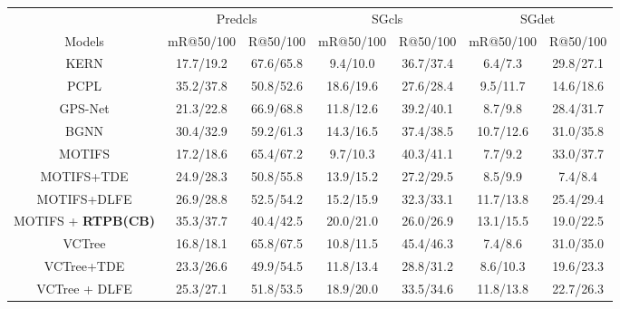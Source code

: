 \documentclass[letterpaper]{article} %
\begin{document}
\begin{table}[!ht]
	\centering
	\small
	\begin{tabular}{c|cc|cc|cc}
		\hline
		& \multicolumn{2}{c|}{Predcls} & \multicolumn{2}{c|}{SGcls} & \multicolumn{2}{c}{SGdet} \\
		Models                         & mR@50/100     & R@50/100     & mR@50/100    & R@50/100    & mR@50/100    & R@50/100    \\ \hline
		KERN\ddag\cite{chen2019knowledge}                      & 17.7/19.2     & 67.6/65.8    & 9.4/10.0     & 36.7/37.4   & 6.4/7.3      & 29.8/27.1   \\
		PCPL\ddag\cite{yan2020pcpl}                      & 35.2/37.8     & 50.8/52.6    & 18.6/19.6    & 27.6/28.4   & 9.5/11.7     & 14.6/18.6   \\
		GPS-Net\ddag\cite{lin2020gps}                        & 21.3/22.8   & 66.9/68.8    & 11.8/12.6      & 39.2/40.1   &8.7/9.8      & 28.4/31.7   \\
		BGNN\cite{li2021bipartite}                           & 30.4/32.9     & 59.2/61.3    & 14.3/16.5    & 37.4/38.5   & 10.7/12.6    & 31.0/35.8   \\ \hline
		MOTIFS\dag\cite{Zellers_2018_CVPR}                    & 17.2/18.6     & 65.4/67.2    & 9.7/10.3     & 40.3/41.1   & 7.7/9.2      & 33.0/37.7   \\
		MOTIFS+TDE\cite{Tang2020_unbiased}                        & 24.9/28.3     & 50.8/55.8    & 13.9/15.2    & 27.2/29.5   & 8.5/9.9    & 7.4/8.4  \\
		MOTIFS+DLFE\cite{chiou2021recovering}                    & 26.9/28.8     & 52.5/54.2    & 15.2/15.9    & 32.3/33.1   & 11.7/13.8    & 25.4/29.4   \\
		MOTIFS + \textbf{RTPB(CB)}               & 35.3/37.7     & 40.4/42.5    & 20.0/21.0    & 26.0/26.9   & 13.1/15.5    & 19.0/22.5   \\ \hline
		VCTree\dag\cite{VCTree_tang}                    & 16.8/18.1     & 65.8/67.5    & 10.8/11.5    & 45.4/46.3   & 7.4/8.6      & 31.0/35.0   \\
		VCTree+TDE\cite{Tang2020_unbiased}                        & 23.3/26.6     & 49.9/54.5    & 11.8/13.4 & 28.8/31.2   & 8.6/10.3    & 19.6/23.3  \\
		VCTree + DLFE\cite{chiou2021recovering}                  & 25.3/27.1     & 51.8/53.5    & 18.9/20.0    & 33.5/34.6   & 11.8/13.8    & 22.7/26.3   \\

\end{tabular}
\end{table}
\end{document}

